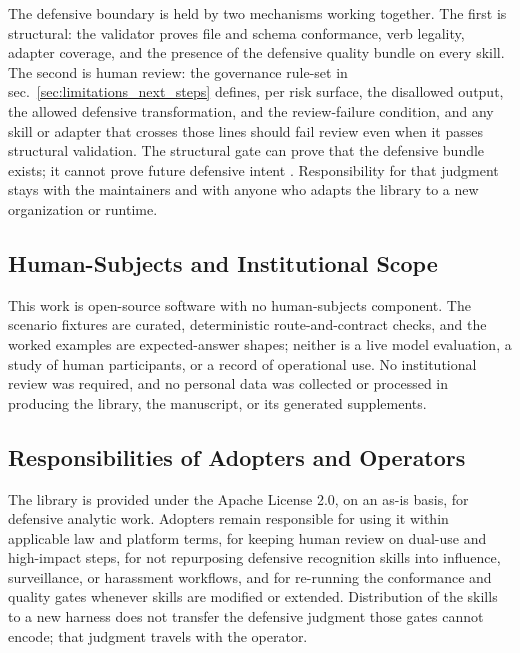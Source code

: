 \documentclass[
]{article}
\begin{document}
The defensive boundary is held by two mechanisms working together. The
first is structural: the validator proves file and schema conformance,
verb legality, adapter coverage, and the presence of the defensive
quality bundle on every skill. The second is human review: the
governance rule-set in sec.~\ref{sec:limitations_next_steps} defines,
per risk surface, the disallowed output, the allowed defensive
transformation, and the review-failure condition, and any skill or
adapter that crosses those lines should fail review even when it passes
structural validation. The structural gate can prove that the defensive
bundle exists; it cannot prove future defensive intent
\citep{ageint2026}. Responsibility for that judgment stays with the
maintainers and with anyone who adapts the library to a new organization
or runtime.

\subsection{Human-Subjects and Institutional
Scope}\label{human-subjects-and-institutional-scope}

This work is open-source software with no human-subjects component. The
scenario fixtures are curated, deterministic route-and-contract checks,
and the worked examples are expected-answer shapes; neither is a live
model evaluation, a study of human participants, or a record of
operational use. No institutional review was required, and no personal
data was collected or processed in producing the library, the
manuscript, or its generated supplements.

\subsection{Responsibilities of Adopters and
Operators}\label{responsibilities-of-adopters-and-operators}

The library is provided under the Apache License 2.0, on an as-is basis,
for defensive analytic work. Adopters remain responsible for using it
within applicable law and platform terms, for keeping human review on
dual-use and high-impact steps, for not repurposing defensive
recognition skills into influence, surveillance, or harassment
workflows, and for re-running the conformance and quality gates whenever
skills are modified or extended. Distribution of the skills to a new
harness does not transfer the defensive judgment those gates cannot
encode; that judgment travels with the operator.
\end{document}
